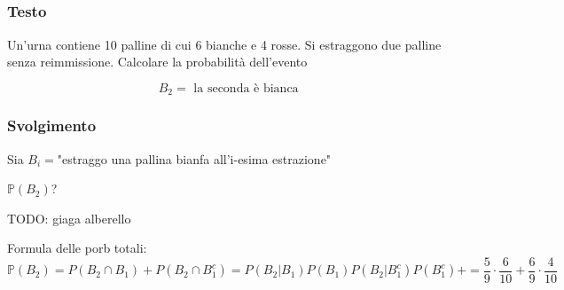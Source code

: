 \subsection{}
\subsubsection{Testo}
Un'urna contiene 10 palline di cui 6 bianche e 4 rosse. Si estraggono due palline senza reimmissione. Calcolare la probabilità dell'evento

\[
    B_2 =\text{ la seconda è bianca }
\]

\subsubsection{Svolgimento}
Sia $B_i = $"estraggo una pallina bianfa all'i-esima estrazione"

$\mathbb{P}(B_2)$?

TODO: giaga alberello

Formula delle porb totali:
\[
    \mathbb{P}(B_2) = P(B_2 \cap B_1) + P(B_2\cap B_1^c )= P(B_2| B_1)P (B_1)  P(B_2| B_1^c)P (B_1^c) +  = \frac{5}{9}\cdot \frac{6}{10}+\frac{6}{9}\cdot\frac{4}{10}
\]